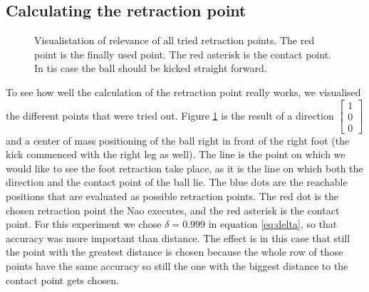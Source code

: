 \documentclass[a4paper]{article}
\begin{document}
\subsection{Calculating the retraction point}
\begin{figure}[htbp]
  \centering
  \caption{Visualistation of relevance of all tried retraction points. The red
      point is the finally used point. The red asterisk is the contact point. In
      tis case the ball should be kicked straight forward.
         }
  \label{fig:retraction_plot1}
\end{figure}
\FloatBarrier
To see how well the calculation of the retraction point really works, we
visualised the different points that were tried out. Figure \ref{fig:retraction_plot1}
is the result of a direction 
$\begin{bmatrix} 1 \\  0 \\ 0 \end{bmatrix}$ and a center of mass positioning of
    the ball right in front of the right foot (the kick commenced with the right
    leg as well). The line is the point on which we
    would like to see the foot retraction take place, as it is the line on which
    both the direction and the contact point of the ball lie. The blue dots are
    the reachable positions that are evaluated as possible retraction points. The red dot is the
    chosen retraction point the Nao executes, and the red asterisk is the contact
    point. For this experiment we chose 
    $\delta = 0.999$ in equation \ref{eq:delta}, so that accuracy was more important than distance. The
    effect is in this case that still the point with the greatest distance is
    chosen because the whole row of those points have the same accuracy so still
    the one with the biggest distance to the contact point gets chosen.
\end{document}
